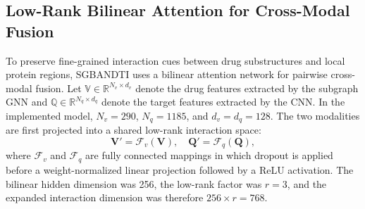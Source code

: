 \documentclass[computers,article,submit,moreauthors]{Definitions/mdpi}
\begin{document}
\subsection{Low-Rank Bilinear Attention for Cross-Modal Fusion}
To preserve fine-grained interaction cues between drug substructures and local protein regions, SGBANDTI uses a bilinear attention network for pairwise cross-modal fusion. Let $\mathbb{V} \in \mathbb{R}^{N_v \times d_v}$ denote the drug features extracted by the subgraph GNN and $\mathbb{Q} \in \mathbb{R}^{N_q \times d_q}$ denote the target features extracted by the CNN. In the implemented model, $N_v=290$, $N_q=1185$, and $d_v=d_q=128$. The two modalities are first projected into a shared low-rank interaction space:
\begin{equation}
\mathbf{V}' = \mathcal{F}_v(\mathbf{V}), \quad \mathbf{Q}' = \mathcal{F}_q(\mathbf{Q}),
\end{equation}
where $\mathcal{F}_v$ and $\mathcal{F}_q$ are fully connected mappings in which dropout is applied before a weight-normalized linear projection followed by a ReLU activation. The bilinear hidden dimension was 256, the low-rank factor was $r=3$, and the expanded interaction dimension was therefore $256 \times r = 768$.
\end{document}
